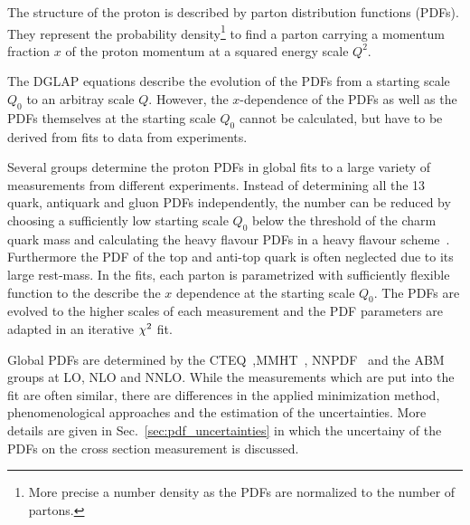 The structure of the proton is described by parton distribution functions
(PDFs). They represent the probability density\footnote{More precise a number
density as the PDFs are normalized to the number of partons.} to find a parton
carrying a momentum fraction $x$ of the proton momentum at a squared energy
scale $Q^2$. 

The DGLAP equations describe the evolution of the PDFs from a starting scale
$Q_0$ to an arbitray scale $Q$. However, the $x$-dependence of the PDFs as well
as the PDFs themselves at the starting scale $Q_0$ cannot be calculated, but
have to be derived from fits to data from experiments.

Several groups determine the proton PDFs in global fits to a large variety of
measurements from different experiments. Instead of determining all the 13
quark, antiquark and gluon PDFs independently, the number can be reduced by
choosing a sufficiently low starting scale $Q_0$ below the threshold of the
charm quark mass and calculating the heavy flavour PDFs in a heavy flavour
scheme~\cite{Thorne:2006qt}. Furthermore the PDF of the top and anti-top quark is
often neglected due to its large rest-mass. In the fits, each parton is
parametrized with sufficiently flexible function to the describe the $x$
dependence at the starting scale $Q_0$. The PDFs are evolved to the higher
scales of each measurement and the PDF parameters are adapted in an iterative
$\chi^2$ fit.

Global PDFs are determined by the
CTEQ~\cite{Dulat:2015mca},MMHT~\cite{Harland-Lang:2014zoa},
NNPDF~\cite{Ball:2014uwa} and the ABM~\cite{Alekhin:2013nda} groups at LO, NLO
and NNLO. While the measurements which are put into the fit are often similar,
there are differences in the applied minimization method, phenomenological
approaches and the estimation of the uncertainties. More details are given in
Sec.~\ref{sec:pdf_uncertainties} in which the uncertainy of the PDFs on the
cross section measurement is discussed.

